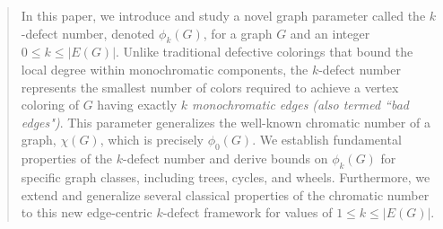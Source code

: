 \documentclass[12pt]{amsart}
\theoremstyle{definition}
\theoremstyle{remark}
\numberwithin{equation}{section}
\begin{document}
\begin{abstract}

In this paper, we introduce and study a novel graph parameter called the $k$-defect number, denoted $\phi_{k}(G)$, for a graph $G$ and an integer $0\leq k\leq |E(G)|$. Unlike traditional defective colorings that bound the local degree within monochromatic components, the $k$-defect number represents the smallest number of colors required to achieve a vertex coloring of $G$ having exactly \emph{$k$ monochromatic edges (also termed ``bad edges")}. This parameter generalizes the well-known chromatic number of a graph, $\chi (G)$, which is precisely $\phi _{0}(G)$. We establish fundamental properties of the $k$-defect number and derive bounds on $\phi _{k}(G)$ for specific graph classes, including trees, cycles, and wheels. Furthermore, we extend and generalize several classical properties of the chromatic number to this new edge-centric $k$-defect framework for values of $1\leq k\leq |E(G)|$. %
\end{abstract}
\end{document}
